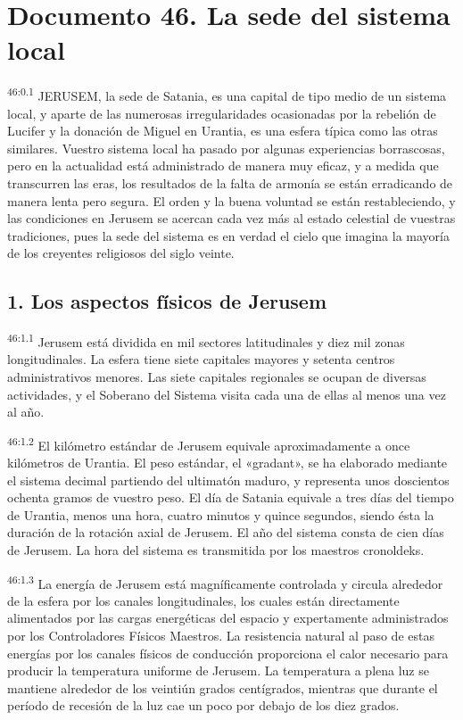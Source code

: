 \chapter{Documento 46. La sede del sistema local}
\par
\textsuperscript{46:0.1} JERUSEM, la sede de Satania, es una capital de tipo medio de un sistema local, y aparte de las numerosas irregularidades ocasionadas por la rebelión de Lucifer y la donación de Miguel en Urantia, es una esfera típica como las otras similares. Vuestro sistema local ha pasado por algunas experiencias borrascosas, pero en la actualidad está administrado de manera muy eficaz, y a medida que transcurren las eras, los resultados de la falta de armonía se están erradicando de manera lenta pero segura. El orden y la buena voluntad se están restableciendo, y las condiciones en Jerusem se acercan cada vez más al estado celestial de vuestras tradiciones, pues la sede del sistema es en verdad el cielo que imagina la mayoría de los creyentes religiosos del siglo veinte.

\section*{1. Los aspectos físicos de Jerusem}
\par
\textsuperscript{46:1.1} Jerusem está dividida en mil sectores latitudinales y diez mil zonas longitudinales. La esfera tiene siete capitales mayores y setenta centros administrativos menores. Las siete capitales regionales se ocupan de diversas actividades, y el Soberano del Sistema visita cada una de ellas al menos una vez al año.

\par
\textsuperscript{46:1.2} El kilómetro estándar de Jerusem equivale aproximadamente a once kilómetros de Urantia. El peso estándar, el «gradant», se ha elaborado mediante el sistema decimal partiendo del ultimatón maduro, y representa unos doscientos ochenta gramos de vuestro peso. El día de Satania equivale a tres días del tiempo de Urantia, menos una hora, cuatro minutos y quince segundos, siendo ésta la duración de la rotación axial de Jerusem. El año del sistema consta de cien días de Jerusem. La hora del sistema es transmitida por los maestros cronoldeks.

\par
\textsuperscript{46:1.3} La energía de Jerusem está magníficamente controlada y circula alrededor de la esfera por los canales longitudinales, los cuales están directamente alimentados por las cargas energéticas del espacio y expertamente administrados por los Controladores Físicos Maestros. La resistencia natural al paso de estas energías por los canales físicos de conducción proporciona el calor necesario para producir la temperatura uniforme de Jerusem. La temperatura a plena luz se mantiene alrededor de los veintiún grados centígrados, mientras que durante el período de recesión de la luz cae un poco por debajo de los diez grados.

